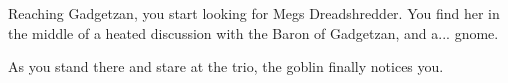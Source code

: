 Reaching Gadgetzan, you start looking for Megs Dreadshredder. You find her in the middle of a heated discussion with the Baron of Gadgetzan, and a... gnome.



As you stand there and stare at the trio, the goblin finally notices you.


